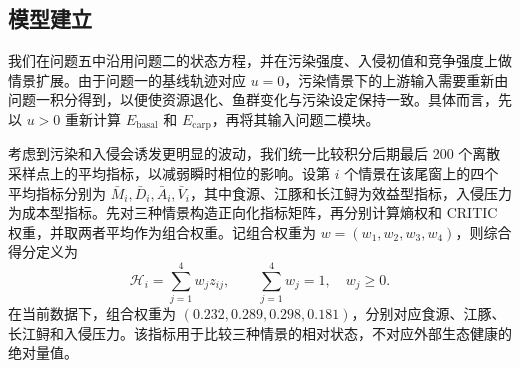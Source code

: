 \subsection{模型建立}
我们在问题五中沿用问题二的状态方程，并在污染强度、入侵初值和竞争强度上做情景扩展。由于问题一的基线轨迹对应 $u=0$，污染情景下的上游输入需要重新由问题一积分得到，以便使资源退化、鱼群变化与污染设定保持一致。具体而言，先以 $u>0$ 重新计算 $E_{\text{basal}}$ 和 $E_{\text{carp}}$，再将其输入问题二模块。

考虑到污染和入侵会诱发更明显的波动，我们统一比较积分后期最后 200 个离散采样点上的平均指标，以减弱瞬时相位的影响。设第 $i$ 个情景在该尾窗上的四个平均指标分别为 $\bar M_i,\bar D_i,\bar A_i,\bar V_i$，其中食源、江豚和长江鲟为效益型指标，入侵压力为成本型指标。先对三种情景构造正向化指标矩阵，再分别计算熵权和 CRITIC 权重，并取两者平均作为组合权重。记组合权重为 $w=(w_1,w_2,w_3,w_4)$，则综合得分定义为
\begin{equation}
\mathcal{H}_i=\sum_{j=1}^{4}w_j z_{ij},\qquad \sum_{j=1}^{4}w_j=1,\quad w_j\ge 0.
\end{equation}
在当前数据下，组合权重为 $(0.232,0.289,0.298,0.181)$，分别对应食源、江豚、长江鲟和入侵压力。该指标用于比较三种情景的相对状态，不对应外部生态健康的绝对量值。

